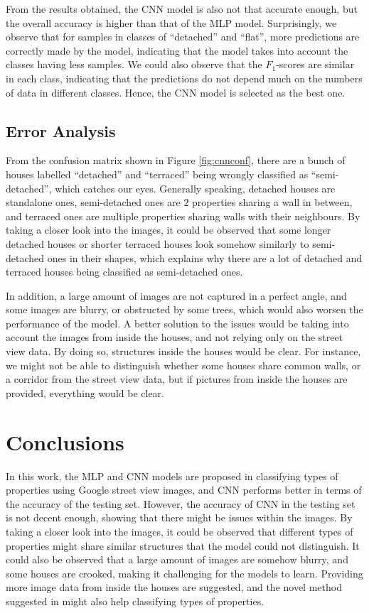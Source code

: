 \documentclass[11pt,twoside]{article}
\numberwithin{Theorem}{section}
\numberwithin{Definition}{section}
\numberwithin{Lemma}{section}
\numberwithin{Algorithm}{section}
\numberwithin{equation}{section}
\begin{document}
From the results obtained, the CNN model is also not that accurate enough, but the overall accuracy is higher than that of the MLP model. Surprisingly, we observe that for samples in classes of  “detached” and  “flat”, more predictions are correctly made by the model, indicating that the model takes into account the classes having less samples. We could also observe that the $F_1$-scores are similar in each class, indicating that the predictions do not depend much on the numbers of data in different classes. Hence, the CNN model is selected as the best one.

\subsection{Error Analysis}
From the confusion matrix shown in Figure \ref{fig:cnnconf}, there are a bunch of houses labelled “detached” and “terraced” being wrongly classified as “semi-detached”, which catches our eyes. Generally speaking, detached houses are standalone ones, semi-detached ones are $2$ properties sharing a wall in between, and terraced ones are multiple properties sharing walls with their neighbours. By taking a closer look into the images, it could be observed that some longer detached houses or shorter terraced houses look somehow similarly to semi-detached ones in their shapes, which explains why there are a lot of detached and terraced houses being classified as semi-detached ones. 

In addition, a large amount of images are not captured in a perfect angle, and some images are blurry, or obstructed by some trees, which would also worsen the performance of the model. A better solution to the issues would be taking into account the images from inside the houses, and not relying only on the street view data. By doing so, structures inside the houses would be clear. For instance, we might not be able to distinguish whether some houses share common walls, or a corridor from the street view data, but if pictures from inside the houses are provided, everything would be clear.

\section{Conclusions}
In this work, the MLP and CNN models are proposed in classifying types of properties using Google street view images, and CNN performs better in terms of the accuracy of the testing set. However, the accuracy of CNN in the testing set is not decent enough, showing that there might be issues within the images. By taking a closer look into the images, it could be observed that different types of properties might share similar structures that the model could not distinguish. It could also be observed that a large amount of images are somehow blurry, and some houses are crooked, making it challenging for the models to learn. Providing more image data from inside the houses are suggested, and the novel method suggested in \cite{avelar2020superpixel} might also help classifying types of properties.
\newpage


\end{document}
